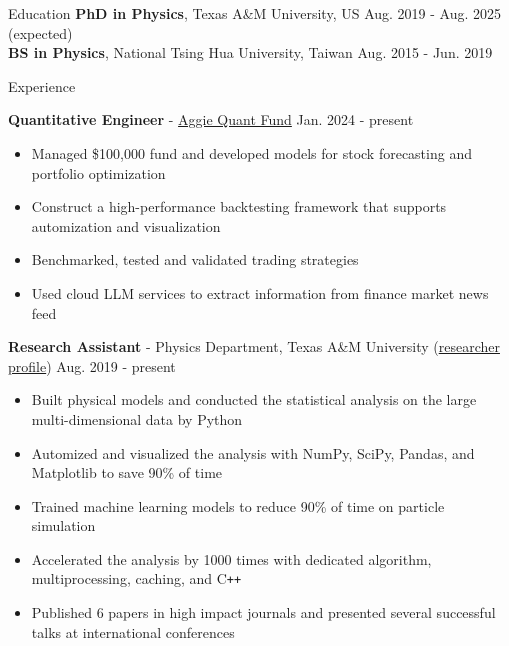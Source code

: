 \documentclass{resume}
\begin{document}
\vspace{-1.5em}
\begin{rSection}{Education}
\vspace{-0.25em}
{\bf PhD in Physics}, Texas A\&M University, US \hfill {Aug. 2019 - Aug. 2025 (expected)} \\
{\bf BS in Physics}, National Tsing Hua University, Taiwan \hfill {Aug. 2015 - Jun. 2019}
\end{rSection}


\begin{rSection}{Experience}
    \vspace{-1em}
    \item \textbf{Quantitative Engineer} - \href{https://www.linkedin.com/company/aggieqf}{Aggie Quant Fund} \hfill Jan. 2024 - present
        \begin{itemize}
        \item Managed \$100,000 fund and developed models for stock forecasting and portfolio optimization
        \item Construct a high-performance backtesting framework that supports automization and visualization
        \item Benchmarked, tested and validated trading strategies
        \item Used cloud LLM services to extract information from finance market news feed
        \end{itemize}

    \item \textbf{Research Assistant} - Physics Department, Texas A\&M University (\href{https://inspirehep.net/authors/2661451}{researcher profile}) \hfill Aug. 2019 - present
        \begin{itemize}
        \item Built physical models and conducted the statistical analysis on the large multi-dimensional data by Python
        \item Automized and visualized the analysis with NumPy, SciPy, Pandas, and Matplotlib to save 90\% of time
        \item Trained machine learning models to reduce 90\% of time on particle simulation
        \item Accelerated the analysis by 1000 times with dedicated algorithm, multiprocessing, caching, and C\texttt{++}
        \item Published 6 papers in high impact journals and presented several successful talks at international conferences
        \end{itemize}


\end{rSection}
\end{document}
